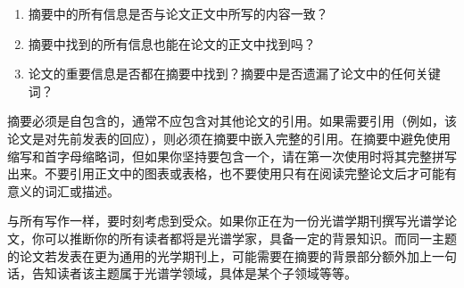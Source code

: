 \begin{enumerate}
\item 摘要中的所有信息是否与论文正文中所写的内容一致？

\item 摘要中找到的所有信息也能在论文的正文中找到吗？

\item 论文的重要信息是否都在摘要中找到？摘要中是否遗漏了论文中的任何关键词？

\end{enumerate}

摘要必须是自包含的，通常不应包含对其他论文的引用。如果需要引用（例如，该论文是对先前发表的回应），则必须在摘要中嵌入完整的引用。在摘要中避免使用缩写和首字母缩略词，但如果你坚持要包含一个，请在第一次使用时将其完整拼写出来。不要引用正文中的图表或表格，也不要使用只有在阅读完整论文后才可能有意义的词汇或描述。

与所有写作一样，要时刻考虑到受众。如果你正在为一份光谱学期刊撰写光谱学论文，你可以推断你的所有读者都将是光谱学家，具备一定的背景知识。而同一主题的论文若发表在更为通用的光学期刊上，可能需要在摘要的背景部分额外加上一句话，告知读者该主题属于光谱学领域，具体是某个子领域等等。

